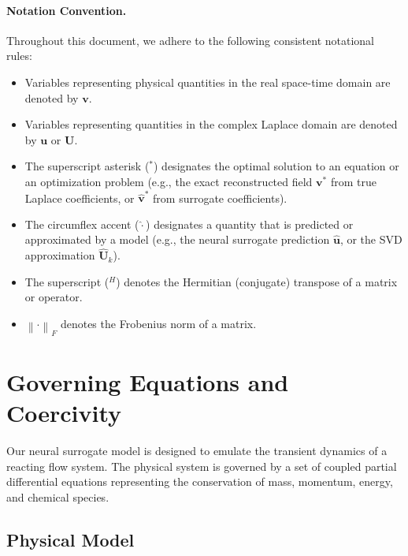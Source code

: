 \documentclass[11pt, a4paper]{article}
\newcommand{\norm}[1]{\left\|#1\right\|}
\begin{document}
\paragraph{Notation Convention.} Throughout this document, we adhere to the following consistent notational rules:
\begin{itemize}
    \item Variables representing physical quantities in the real space-time domain are denoted by $\mathbf{v}$.
    \item Variables representing quantities in the complex Laplace domain are denoted by $\mathbf{u}$ or $\mathbf{U}$.
    \item The superscript asterisk ($^*$) designates the optimal solution to an equation or an optimization problem (e.g., the exact reconstructed field $\mathbf{v}^*$ from true Laplace coefficients, or $\hat{\mathbf{v}}^*$ from surrogate coefficients).
    \item The circumflex accent ($\hat{\cdot}$) designates a quantity that is predicted or approximated by a model (e.g., the neural surrogate prediction $\hat{\mathbf{u}}$, or the SVD approximation $\hat{\mathbf{U}}_k$).
    \item The superscript ($^H$) denotes the Hermitian (conjugate) transpose of a matrix or operator.
    \item $\norm{\cdot}_F$ denotes the Frobenius norm of a matrix.
\end{itemize}



\section{Governing Equations and Coercivity}

Our neural surrogate model is designed to emulate the transient dynamics of a reacting flow system. The physical system is governed by a set of coupled partial differential equations representing the conservation of mass, momentum, energy, and chemical species. 

\subsection{Physical Model}
\end{document}
